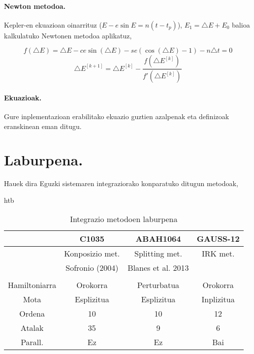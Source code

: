 \paragraph*{\textbf{Newton metodoa}.} Kepler-en ekuazioan oinarrituz ($E-e\sin E=n (t-t_p)$),  $E_1=\triangle E+E_0$ balioa kalkulatuko Newtonen metodoa aplikatuz,

\begin{equation*}
f(\triangle E)=\triangle E - ce \sin(\triangle E)- se (\cos(\triangle E)-1)-n \triangle t=0
\end{equation*}
\begin{equation}
\triangle E^{[k+1]}=\triangle E^{[k]}- \frac{f(\triangle E^{[k]})}{f'(\triangle E^{[k]})}
\end{equation}

\paragraph*{\textbf{Ekuazioak}.} Gure inplementazioan erabilitako ekuazio guztien azalpenak eta definizoak eranskinean eman ditugu.

\section{Laburpena.}

Hauek dira Eguzki sistemaren integraziorako konparatuko ditugun metodoak,

\begin{table}{htb}
\caption{Integrazio metodoen laburpena}
\label{tab:1}       %
\begin{tabular}{ c|c c c } 
           &  C1035             &  ABAH1064           & GAUSS-12           \\
 \hline
 	       & Konposizio met.    & Splitting met.     & IRK met.            \\
 	       & Sofronio (2004)    & Blanes et al. 2013 &                     \\
 \hline 
               &                    &                    &                 \\
 Hamiltoniarra & Orokorra           & Perturbatua        & Orokorra        \\ 	    
 Mota          & Esplizitua         & Esplizitua         & Inplizitua      \\ 
 Ordena        & 10                 & 10                 & 12              \\ 
 Atalak        & 35                 & 9                  & 6               \\ 
 Parall.       & Ez                 & Ez                 & Bai             \\  
\end{tabular}
\end{table}
 
